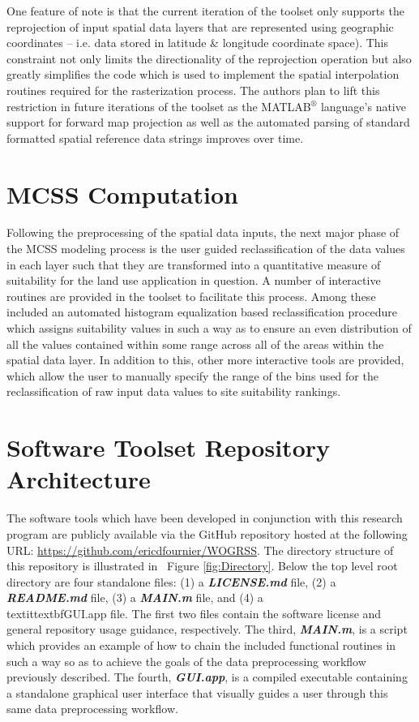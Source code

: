             
One feature of note is that the current iteration of the toolset only supports the reprojection of input spatial data layers that are represented using geographic coordinates -- i.e. data stored in latitude \& longitude coordinate space). This constraint not only limits the directionality of the reprojection operation but also greatly simplifies the code which is used to implement the spatial interpolation routines required for the rasterization process. The authors plan to lift this restriction in future iterations of the toolset as the MATLAB$^{\circledR}$ language's native support for forward map projection as well as the automated parsing of standard formatted spatial reference data strings improves over time.   
            
\section{MCSS Computation}
            
Following the preprocessing of the spatial data inputs, the next major phase of the MCSS modeling process is the user guided reclassification of the data values in each layer such that they are transformed into a quantitative measure of suitability for the land use application in question. A number of interactive routines are provided in the toolset to facilitate this process. Among these included an automated histogram equalization based reclassification procedure which assigns suitability values in such a way as to ensure an even distribution of all the values contained within some range across all of the areas within the spatial data layer. In addition to this, other more interactive tools are provided, which allow the user to manually specify the range of the bins used for the reclassification of raw input data values to site suitability rankings. 

\section{Software Toolset Repository Architecture}
    
The software tools which have been developed in conjunction with this research program are publicly available via the GitHub repository hosted at the following URL: \url{https://github.com/ericdfournier/WOGRSS}. The directory structure of this repository is illustrated in ~Figure \ref{fig:Directory}. Below the top level root directory are four standalone files: (1) a \textit{\textbf{LICENSE.md}} file, (2) a \textit{\textbf{README.md}} file, (3) a \textit{\textbf{MAIN.m}} file, and (4) a \\textit{textbf{GUI.app}} file. The first two files contain the software license and general repository usage guidance, respectively. The third, \textit{\textbf{MAIN.m}}, is a script which provides an example of how to chain the included functional routines in such a way so as to achieve the goals of the data preprocessing workflow previously described. The fourth, \textit{\textbf{GUI.app}}, is a compiled executable containing a standalone graphical user interface that visually guides a user through this same data preprocessing workflow.

